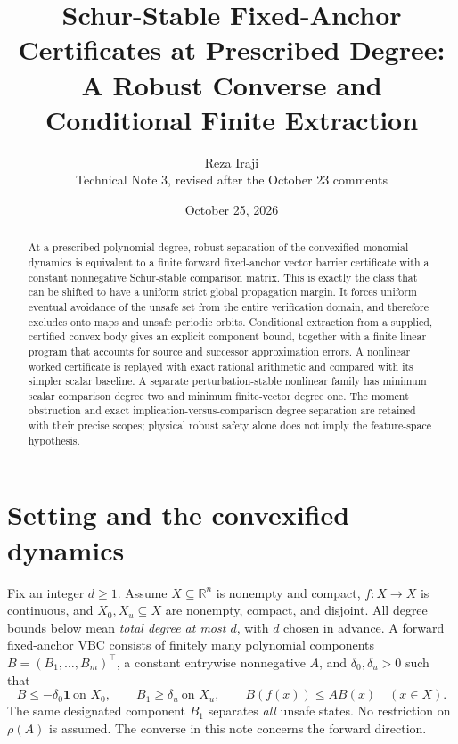 \documentclass[10pt,letterpaper]{article}
\title{Schur-Stable Fixed-Anchor Certificates at Prescribed Degree:\\A Robust Converse and Conditional Finite Extraction}
\author{Reza Iraji\\{\small Technical Note 3, revised after the October 23 comments}}
\date{October 25, 2026}
\theoremstyle{remark}
\newcommand{\R}{\mathbb R}
\newcommand{\one}{\mathbf 1}
\begin{document}
\maketitle
\vspace{-1em}
\begin{abstract}
At a prescribed polynomial degree, robust separation of the convexified monomial dynamics is equivalent to a finite forward fixed-anchor vector barrier certificate with a constant nonnegative Schur-stable comparison matrix. This is exactly the class that can be shifted to have a uniform strict global propagation margin. It forces uniform eventual avoidance of the unsafe set from the entire verification domain, and therefore excludes onto maps and unsafe periodic orbits. Conditional extraction from a supplied, certified convex body gives an explicit component bound, together with a finite linear program that accounts for source and successor approximation errors. A nonlinear worked certificate is replayed with exact rational arithmetic and compared with its simpler scalar baseline. A separate perturbation-stable nonlinear family has minimum scalar comparison degree two and minimum finite-vector degree one. The moment obstruction and exact implication-versus-comparison degree separation are retained with their precise scopes; physical robust safety alone does not imply the feature-space hypothesis.
\end{abstract}

\section{Setting and the convexified dynamics}
Fix an integer $d\geq1$. Assume $X\subseteq\R^n$ is nonempty and compact, $f:X\to X$ is continuous, and $X_0,X_u\subseteq X$ are nonempty, compact, and disjoint. All degree bounds below mean \emph{total degree at most $d$}, with $d$ chosen in advance. A forward fixed-anchor VBC consists of finitely many polynomial components $B=(B_1,\ldots,B_m)^\top$, a constant entrywise nonnegative $A$, and $\delta_0,\delta_u>0$ such that
\begin{equation}\label{eq:ordinary}
 B\leq-\delta_0\one\ \text{on }X_0,\qquad
 B_1\geq\delta_u\ \text{on }X_u,\qquad
 B(f(x))\leq AB(x)\quad(x\in X).
\end{equation}
The same designated component $B_1$ separates \emph{all} unsafe states. No restriction on $\rho(A)$ is assumed. The converse in this note concerns the forward direction.
\end{document}
